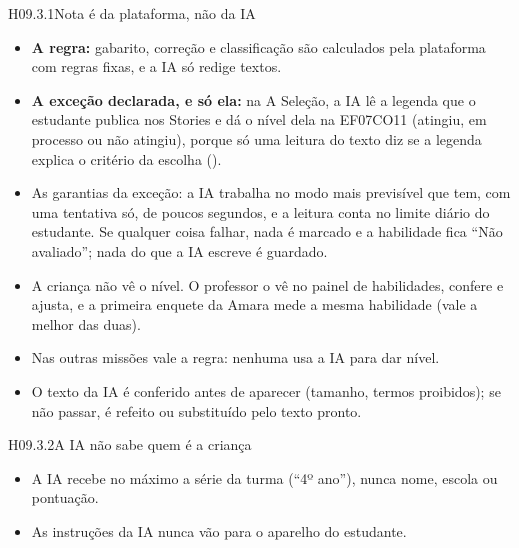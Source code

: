 \begin{historia}{H09.3.1}{Nota é da plataforma, não da IA}{\pronto}
\aceite
\begin{itemize}
  \item \textbf{A regra:} gabarito, correção e classificação são calculados
    pela plataforma com regras fixas, e a IA só redige textos.
  \item \textbf{A exceção declarada, e só ela:} na A Seleção, a IA lê a
    legenda que o estudante publica nos Stories e dá o nível dela na EF07CO11
    (atingiu, em processo ou não atingiu), porque só uma leitura do texto diz se
    a legenda explica o critério da escolha ().
  \item As garantias da exceção: a IA trabalha no modo mais previsível que tem,
    com uma tentativa só, de poucos segundos, e a leitura conta no limite
    diário do estudante. Se qualquer coisa falhar, nada é marcado e a
    habilidade fica \enquote{Não avaliado}; nada do que a IA escreve é guardado.
  \item A criança não vê o nível. O professor o vê no painel de habilidades,
    confere e ajusta, e a primeira enquete da Amara mede a mesma habilidade
    (vale a melhor das duas).
  \item Nas outras missões vale a regra: nenhuma usa a IA para dar nível.
  \item O texto da IA é conferido antes de aparecer (tamanho, termos
    proibidos); se não passar, é refeito ou substituído pelo texto pronto.
\end{itemize}
\end{historia}

\begin{historia}{H09.3.2}{A IA não sabe quem é a criança}{\pronto}
\aceite
\begin{itemize}
  \item A IA recebe no máximo a série da turma (\enquote{4º ano}), nunca nome,
    escola ou pontuação.
  \item As instruções da IA nunca vão para o aparelho do estudante.
\end{itemize}
\end{historia}

